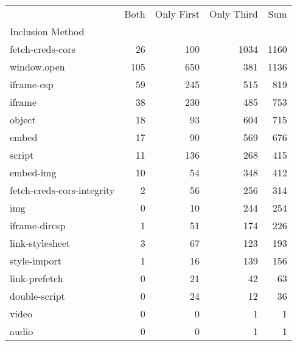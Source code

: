 \begin{tabular}{lrrrr}
 & Both & Only First & Only Third & Sum \\
Inclusion Method &  &  &  &  \\
fetch-creds-cors & 26 & 100 & 1034 & 1160 \\
window.open & 105 & 650 & 381 & 1136 \\
iframe-csp & 59 & 245 & 515 & 819 \\
iframe & 38 & 230 & 485 & 753 \\
object & 18 & 93 & 604 & 715 \\
embed & 17 & 90 & 569 & 676 \\
script & 11 & 136 & 268 & 415 \\
embed-img & 10 & 54 & 348 & 412 \\
fetch-creds-cors-integrity & 2 & 56 & 256 & 314 \\
img & 0 & 10 & 244 & 254 \\
iframe-dircsp & 1 & 51 & 174 & 226 \\
link-stylesheet & 3 & 67 & 123 & 193 \\
style-import & 1 & 16 & 139 & 156 \\
link-prefetch & 0 & 21 & 42 & 63 \\
double-script & 0 & 24 & 12 & 36 \\
video & 0 & 0 & 1 & 1 \\
audio & 0 & 0 & 1 & 1 \\
\end{tabular}
